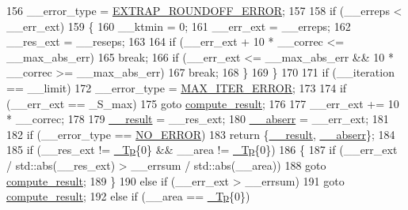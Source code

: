 \begin{DoxyCode}
156             \_\_error\_type = \hyperlink{namespace____gnu__cxx_ad6c62dd86a596716cece6ac2d4cfd4b3ac3b74f0b40291f29a3cb3a188412308b}{EXTRAP\_ROUNDOFF\_ERROR};
157 
158           \textcolor{keywordflow}{if} (\_\_erreps < \_\_err\_ext)
159             \{
160               \_\_ktmin = 0;
161               \_\_err\_ext = \_\_erreps;
162               \_\_res\_ext = \_\_reseps;
163 
164               \textcolor{keywordflow}{if} (\_\_err\_ext + 10 * \_\_correc <= \_\_max\_abs\_err)
165                 \textcolor{keywordflow}{break};
166               \textcolor{keywordflow}{if} (\_\_err\_ext <= \_\_max\_abs\_err && 10 * \_\_correc >= \_\_max\_abs\_err)
167                 \textcolor{keywordflow}{break};
168             \}
169         \}
170 
171       \textcolor{keywordflow}{if} (\_\_iteration == \_\_limit)
172         \_\_error\_type = \hyperlink{namespace____gnu__cxx_ad6c62dd86a596716cece6ac2d4cfd4b3a420d46d10205dd953d0ccce5323afc4c}{MAX\_ITER\_ERROR};
173 
174       \textcolor{keywordflow}{if} (\_\_err\_ext == \_S\_max)
175         \textcolor{keywordflow}{goto} \hyperlink{namespace____gnu__cxx_a10e06852570922cdc1aca86883b5161e}{compute\_result};
176 
177       \_\_err\_ext += 10 * \_\_correc;
178 
179       \hyperlink{namespace____gnu__cxx_a500ea9f53aeaecd8c2ae657503450578}{\_\_result} = \_\_res\_ext;
180       \hyperlink{namespace____gnu__cxx_a72f736cff127f1574e91a301de9e074b}{\_\_abserr} = \_\_err\_ext;
181 
182       \textcolor{keywordflow}{if} (\_\_error\_type == \hyperlink{namespace____gnu__cxx_ad6c62dd86a596716cece6ac2d4cfd4b3ac31eecc280b10dec2efb4a2216ccc2e0}{NO\_ERROR})
183         \textcolor{keywordflow}{return} \{\hyperlink{namespace____gnu__cxx_a500ea9f53aeaecd8c2ae657503450578}{\_\_result}, \hyperlink{namespace____gnu__cxx_a72f736cff127f1574e91a301de9e074b}{\_\_abserr}\};
184 
185       \textcolor{keywordflow}{if} (\_\_res\_ext != \hyperlink{namespace____gnu__cxx_a3b19a9c800ca194374ef9172290f7d79}{\_Tp}\{0\} && \_\_area != \hyperlink{namespace____gnu__cxx_a3b19a9c800ca194374ef9172290f7d79}{\_Tp}\{0\})
186         \{
187           \textcolor{keywordflow}{if} (\_\_err\_ext / std::abs(\_\_res\_ext) > \_\_errsum / std::abs(\_\_area))
188             \textcolor{keywordflow}{goto} \hyperlink{namespace____gnu__cxx_a10e06852570922cdc1aca86883b5161e}{compute\_result};
189         \}
190       \textcolor{keywordflow}{else} \textcolor{keywordflow}{if} (\_\_err\_ext > \_\_errsum)
191         \textcolor{keywordflow}{goto} \hyperlink{namespace____gnu__cxx_a10e06852570922cdc1aca86883b5161e}{compute\_result};
192       \textcolor{keywordflow}{else} \textcolor{keywordflow}{if} (\_\_area == \hyperlink{namespace____gnu__cxx_a3b19a9c800ca194374ef9172290f7d79}{\_Tp}\{0\})

\end{DoxyCode}
